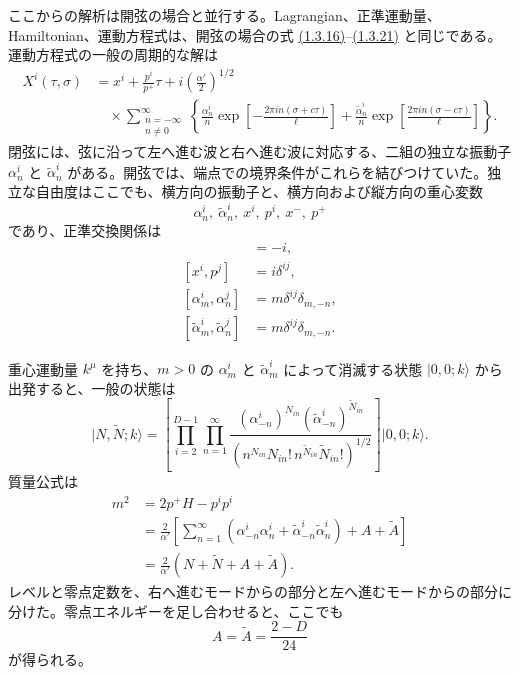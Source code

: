 ここからの解析は開弦の場合と並行する。Lagrangian、正準運動量、Hamiltonian、運動方程式は、開弦の場合の式 \hyperref[eq:1.3.16]{(1.3.16)}--\hyperref[eq:1.3.21]{(1.3.21)} と同じである。運動方程式の一般の周期的な解は
\begin{equation}
\begin{aligned}
X^i(\tau,\sigma)&=x^i+\frac{p^i}{p^+}\tau
+i\left(\frac{\alpha'}2\right)^{1/2}\\
&\quad{}\times\sum_{\substack{n=-\infty\\n\ne0}}^\infty
\left\{
\frac{\alpha_n^i}{n}\exp\left[-\frac{2\pi in(\sigma+c\tau)}{\ell}\right]
+\frac{\widetilde\alpha_n^i}{n}
\exp\left[\frac{2\pi in(\sigma-c\tau)}{\ell}\right]
\right\}.
\end{aligned}
\tag{1.4.4}\label{eq:1.4.4}
\end{equation}
閉弦には、弦に沿って左へ進む波と右へ進む波に対応する、二組の独立な振動子 $\alpha_n^i$ と $\widetilde\alpha_n^i$ がある。開弦では、端点での境界条件がこれらを結びつけていた。独立な自由度はここでも、横方向の振動子と、横方向および縦方向の重心変数
\begin{equation}
\alpha_n^i,\ \widetilde\alpha_n^i,\ x^i,\ p^i,\ x^-,\ p^+
\tag{1.4.5}\label{eq:1.4.5}
\end{equation}
であり、正準交換関係は
\begin{align}
[x^-,p^+]&=-i,
\tag{1.4.6a}\label{eq:1.4.6a}\\
[x^i,p^j]&=i\delta^{ij},
\tag{1.4.6b}\label{eq:1.4.6b}\\
[\alpha_m^i,\alpha_n^j]&=m\delta^{ij}\delta_{m,-n},
\tag{1.4.6c}\label{eq:1.4.6c}\\
[\widetilde\alpha_m^i,\widetilde\alpha_n^j]&=m\delta^{ij}\delta_{m,-n}.
\tag{1.4.6d}\label{eq:1.4.6d}
\end{align}

重心運動量 $k^\mu$ を持ち、$m>0$ の $\alpha_m^i$ と $\widetilde\alpha_m^i$ によって消滅する状態 $\lvert0,0;k\rangle$ から出発すると、一般の状態は
\begin{equation}
\lvert N,\widetilde N;k\rangle
=\left[
\prod_{i=2}^{D-1}\prod_{n=1}^\infty
\frac{(\alpha_{-n}^i)^{N_{in}}
(\widetilde\alpha_{-n}^i)^{\widetilde N_{in}}}
{\left(n^{N_{in}}N_{in}!\,
n^{\widetilde N_{in}}\widetilde N_{in}!\right)^{1/2}}
\right]\lvert0,0;k\rangle.
\tag{1.4.7}\label{eq:1.4.7}
\end{equation}
質量公式は
\begin{equation}
\begin{aligned}
m^2&=2p^+H-p^ip^i\\
&=\frac2{\alpha'}\left[
\sum_{n=1}^\infty\left(\alpha_{-n}^i\alpha_n^i+
\widetilde\alpha_{-n}^i\widetilde\alpha_n^i\right)
+A+\widetilde A\right]\\
&=\frac2{\alpha'}(N+\widetilde N+A+\widetilde A).
\end{aligned}
\tag{1.4.8}\label{eq:1.4.8}
\end{equation}
レベルと零点定数を、右へ進むモードからの部分と左へ進むモードからの部分に分けた。零点エネルギーを足し合わせると、ここでも
\begin{equation}
A=\widetilde A=\frac{2-D}{24}
\tag{1.4.9}\label{eq:1.4.9}
\end{equation}
が得られる。

